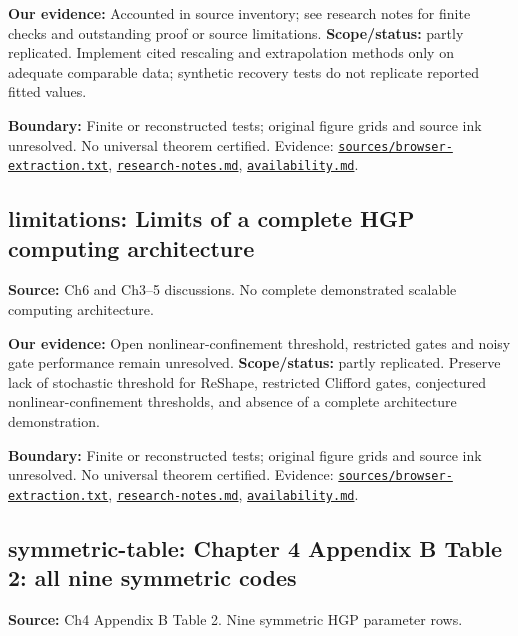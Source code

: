 \documentclass[11pt]{article}
\begin{document}
\textbf{Our evidence:} Accounted in source inventory; see research notes for finite checks and outstanding proof or source limitations. \textbf{Scope/status:} partly replicated. Implement cited rescaling and extrapolation methods only on adequate comparable data; synthetic recovery tests do not replicate reported fitted values.

\textbf{Boundary:} Finite or reconstructed tests; original figure grids and source ink unresolved. No universal theorem certified. Evidence: \href{https://github.com/alectionary/vibe-math/blob/master/formalization/quintavalle-hgp/sources/browser-extraction.txt}{\nolinkurl{sources/browser-extraction.txt}}, \href{https://github.com/alectionary/vibe-math/blob/master/formalization/quintavalle-hgp/research-notes.md}{\nolinkurl{research-notes.md}}, \href{https://github.com/alectionary/vibe-math/blob/master/formalization/quintavalle-hgp/availability.md}{\nolinkurl{availability.md}}.
\subsection{limitations: Limits of a complete HGP computing architecture}
\label{claim:limitations}
\textbf{Source:} Ch6 and Ch3--5 discussions. No complete demonstrated scalable computing architecture.

\textbf{Our evidence:} Open nonlinear-confinement threshold, restricted gates and noisy gate performance remain unresolved. \textbf{Scope/status:} partly replicated. Preserve lack of stochastic threshold for ReShape, restricted Clifford gates, conjectured nonlinear-confinement thresholds, and absence of a complete architecture demonstration.

\textbf{Boundary:} Finite or reconstructed tests; original figure grids and source ink unresolved. No universal theorem certified. Evidence: \href{https://github.com/alectionary/vibe-math/blob/master/formalization/quintavalle-hgp/sources/browser-extraction.txt}{\nolinkurl{sources/browser-extraction.txt}}, \href{https://github.com/alectionary/vibe-math/blob/master/formalization/quintavalle-hgp/research-notes.md}{\nolinkurl{research-notes.md}}, \href{https://github.com/alectionary/vibe-math/blob/master/formalization/quintavalle-hgp/availability.md}{\nolinkurl{availability.md}}.
\subsection{symmetric-table: Chapter 4 Appendix B Table 2: all nine symmetric codes}
\label{claim:symmetric-table}
\textbf{Source:} Ch4 Appendix B Table 2. Nine symmetric HGP parameter rows.
\end{document}
